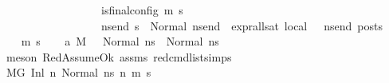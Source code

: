\begin{isabellebody}
\ \ \ \ \ \ \ \ \ \ \ \ \ \ \ \ \ \ {\isacharparenleft}{\kern0pt}is{\isacharunderscore}{\kern0pt}final{\isacharunderscore}{\kern0pt}config\ {\isacharparenleft}{\kern0pt}m{\isacharcomma}{\kern0pt}\ s{\isacharparenright}{\kern0pt}\ {\isasymLongrightarrow}\ \isanewline
\ \ \ \ \ \ \ \ \ \ \ \ \ \ \ \ \ \ {\isacharparenleft}{\kern0pt}{\isasymforall}ns{\isacharunderscore}{\kern0pt}end{\isachardot}{\kern0pt}\ s\ {\isacharequal}{\kern0pt}\ Normal\ ns{\isacharunderscore}{\kern0pt}end\ {\isasymlongrightarrow}\ {\isacharparenleft}{\kern0pt}expr{\isacharunderscore}{\kern0pt}all{\isacharunderscore}{\kern0pt}sat\ {\isasymLambda}{}{\isacharunderscore}{\kern0pt}local\ {\isasymGamma}\ {\isasymOmega}\ ns{\isacharunderscore}{\kern0pt}end{\isacharparenright}{\kern0pt}\ posts{\isacharparenright}{\kern0pt}{\isacharparenright}{\kern0pt}{\isachardoublequoteclose}\isanewline
%
\isadelimproof
%
\endisadelimproof
%
\isatagproof
{}\isamarkupfalse%
\ {\isacharminus}{\kern0pt}\isanewline
\ \ \isamarkupfalse%
\ m{}\ s{}\isanewline
\ \ \isamarkupfalse%
\ a{}{\isacharcolon}{\kern0pt}\ {\isachardoublequoteopen}{\isacharparenleft}{\kern0pt}M{\isacharcomma}{\kern0pt}{\isasymLambda}{\isacharcomma}{\kern0pt}{\isasymGamma}{\isacharcomma}{\kern0pt}{\isasymOmega}\ {\isasymturnstile}\ {\isasymlangle}{\isacharbrackleft}{\kern0pt}{\isacharbrackright}{\kern0pt}{\isacharcomma}{\kern0pt}\ Normal\ ns{}{\isasymrangle}\ {\isacharbrackleft}{\kern0pt}{\isasymrightarrow}{\isacharbrackright}{\kern0pt}\ {\isacharparenleft}{\kern0pt}Normal\ ns{}{\isacharparenright}{\kern0pt}{\isacharparenright}{\kern0pt}{\isachardoublequoteclose}\ \isamarkupfalse%
\ {\isacharparenleft}{\kern0pt}meson\ RedAssumeOk\ assms{\isacharparenleft}{\kern0pt}{}{\isacharparenright}{\kern0pt}\ red{\isacharunderscore}{\kern0pt}cmd{\isacharunderscore}{\kern0pt}list{\isachardot}{\kern0pt}simps{\isacharparenright}{\kern0pt}\isanewline
\ \ \isamarkupfalse%
\ {\isachardoublequoteopen}{\isacharparenleft}{\kern0pt}M{\isacharcomma}{\kern0pt}{\isasymLambda}{\isacharcomma}{\kern0pt}{\isasymGamma}{\isacharcomma}{\kern0pt}{\isasymOmega}{\isacharcomma}{\kern0pt}G\ {\isasymturnstile}{\isacharparenleft}{\kern0pt}Inl\ n{}{\isacharcomma}{\kern0pt}\ Normal\ ns{}{\isacharparenright}{\kern0pt}\ {\isacharminus}{\kern0pt}n{\isasymrightarrow}{\isacharasterisk}{\kern0pt}\ {\isacharparenleft}{\kern0pt}m{}{\isacharcomma}{\kern0pt}\ s{}{\isacharparenright}{\kern0pt}{\isacharparenright}{\kern0pt}\ {\isasymLongrightarrow}\ \isanewline

\end{isabellebody}
